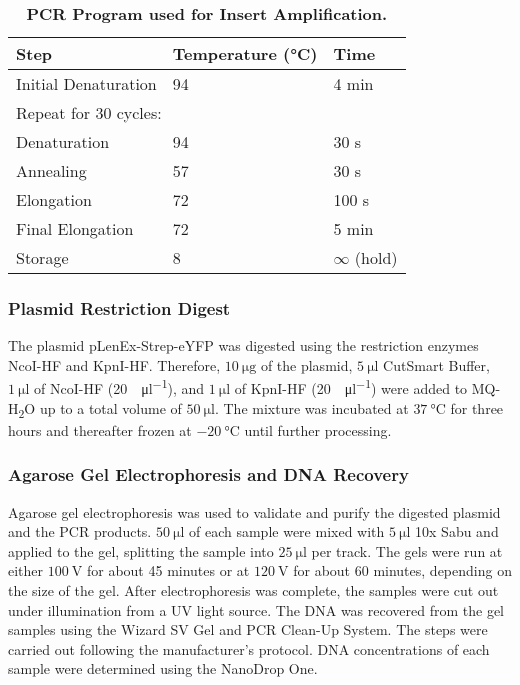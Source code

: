 \begin{table}[ht]
    \centering
    \caption{\textbf{PCR Program used for Insert Amplification.}}
    \label{tab:methods_pcr_cycle}
    \begin{tabular}{lll}
    \toprule
    \textbf{Step} & \textbf{Temperature (°C)} & \textbf{Time} \\
    \midrule
    Initial Denaturation     & 94  & 4 min   \\[1ex]
    \multicolumn{3}{l}{Repeat for 30 cycles:} \\[1ex]
    \quad Denaturation       & 94  & 30 s    \\
    \quad Annealing          & 57  & 30 s    \\
    \quad Elongation         & 72  & 100 s   \\[1ex]
    Final Elongation         & 72  & 5 min   \\
    Storage                  & 8   & $\infty$ (hold)  \\
    \bottomrule
    \end{tabular}
\end{table}
\subsubsection{Plasmid Restriction Digest}
The plasmid pLenEx-Strep-eYFP was digested using the restriction enzymes NcoI-HF and KpnI-HF. Therefore, $\SI{10}{\micro\gram}$ of the plasmid, $\SI{5}{\micro\litre}$ CutSmart\textsuperscript{\textregistered} Buffer, $\SI{1}{\micro\litre}$ of NcoI-HF (\SI{20}{\enzymeUnit\per\micro\litre}), and $\SI{1}{\micro\litre}$ of KpnI-HF (\SI{20}{\enzymeUnit\per\micro\litre}) were added to MQ-H\textsubscript{2}O up to a total volume of $\SI{50}{\micro\litre}$. The mixture was incubated at $\SI{37}{\degreeCelsius}$ for three hours and thereafter frozen at $\SI{-20}{\degreeCelsius}$ until further processing. 

\subsubsection{Agarose Gel Electrophoresis and DNA Recovery}
Agarose gel electrophoresis was used to validate and purify the digested plasmid and the PCR products. $\SI{50}{\micro\litre}$ of each sample were mixed with $\SI{5}{\micro\litre}$ 10x Sabu and applied to the gel, splitting the sample into $\SI{25}{\micro\litre}$ per track. The gels were run at either $\SI{100}{\volt}$ for about 45 minutes or at $\SI{120}{\volt}$ for about 60 minutes, depending on the size of the gel. After electrophoresis was complete, the samples were cut out under illumination from a UV light source. The DNA was recovered from the gel samples using the Wizard\textsuperscript{\textregistered} SV Gel and PCR Clean-Up System. The steps were carried out following the manufacturer's protocol. DNA concentrations of each sample were determined using the NanoDrop\textsuperscript{\texttrademark} One.

